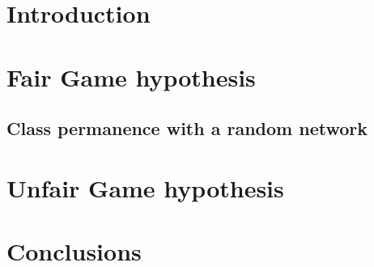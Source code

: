 \documentclass[12pt,a4paper]{article}
\title{}
\author{Simone Balducci, Gregorio Berselli}
\date{}
\begin{document}
\maketitle

\begin{abstract}
    
\end{abstract}

\tableofcontents
\pagebreak

\section{Introduction}


\section{Fair Game hypothesis}


\subsection{Class permanence with a random network}


\section{Unfair Game hypothesis}


\section{Conclusions}


\printbibliography
\end{document}
